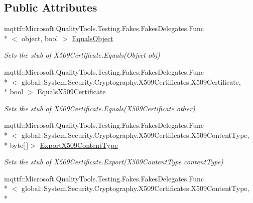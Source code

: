 \subsection*{Public Attributes}
\begin{DoxyCompactItemize}
\item 
mqttf\-::\-Microsoft.\-Quality\-Tools.\-Testing.\-Fakes.\-Fakes\-Delegates.\-Func\\*
$<$ object, bool $>$ \hyperlink{class_system_1_1_security_1_1_cryptography_1_1_x509_certificates_1_1_fakes_1_1_stub_x509_certificate2_a5deaf007f5e9bb5751910f7d22566d0c}{Equals\-Object}
\begin{DoxyCompactList}\small\item\em Sets the stub of X509\-Certificate.\-Equals(\-Object obj)\end{DoxyCompactList}\item 
mqttf\-::\-Microsoft.\-Quality\-Tools.\-Testing.\-Fakes.\-Fakes\-Delegates.\-Func\\*
$<$ global\-::\-System.\-Security.\-Cryptography.\-X509\-Certificates.\-X509\-Certificate, \\*
bool $>$ \hyperlink{class_system_1_1_security_1_1_cryptography_1_1_x509_certificates_1_1_fakes_1_1_stub_x509_certificate2_a5fa3b993e181678b6fc55b590d2dec1c}{Equals\-X509\-Certificate}
\begin{DoxyCompactList}\small\item\em Sets the stub of X509\-Certificate.\-Equals(\-X509\-Certificate other)\end{DoxyCompactList}\item 
mqttf\-::\-Microsoft.\-Quality\-Tools.\-Testing.\-Fakes.\-Fakes\-Delegates.\-Func\\*
$<$ global\-::\-System.\-Security.\-Cryptography.\-X509\-Certificates.\-X509\-Content\-Type, \\*
byte\mbox{[}$\,$\mbox{]}$>$ \hyperlink{class_system_1_1_security_1_1_cryptography_1_1_x509_certificates_1_1_fakes_1_1_stub_x509_certificate2_a8de8738efdecae40a1390226d0917726}{Export\-X509\-Content\-Type}
\begin{DoxyCompactList}\small\item\em Sets the stub of X509\-Certificate.\-Export(\-X509\-Content\-Type content\-Type)\end{DoxyCompactList}\item 
mqttf\-::\-Microsoft.\-Quality\-Tools.\-Testing.\-Fakes.\-Fakes\-Delegates.\-Func\\*
$<$ global\-::\-System.\-Security.\-Cryptography.\-X509\-Certificates.\-X509\-Content\-Type, \\*

\end{DoxyCompactItemize}

